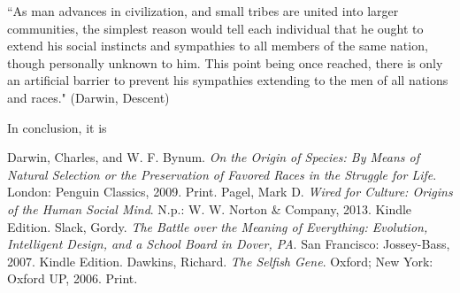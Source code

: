\documentclass[11pt, oneside]{article}
\begin{document}
``As man advances in civilization, and small tribes are united into larger communities, the simplest reason would tell each individual that he ought to extend his social instincts and sympathies to all members of the same nation, though personally unknown to him. This point being once reached, there is only an artificial barrier to prevent his sympathies extending to the men of all nations and races." (Darwin, Descent)

\par In conclusion, it is 

\begin{thebibliography}{9}
	Darwin, Charles, and W. F. Bynum.
	\emph{On the Origin of Species: By Means of Natural Selection or the Preservation of Favored Races in the Struggle for Life}.
	London: Penguin Classics, 2009.
	Print.
	Pagel, Mark D. 
	\emph{Wired for Culture: Origins of the Human Social Mind}. 
	N.p.: W. W. Norton \& Company, 2013. 
	Kindle Edition. 
	Slack, Gordy. 
	\emph{The Battle over the Meaning of Everything: Evolution, Intelligent Design, and a School Board in Dover, PA}.
	San Francisco: Jossey-Bass, 2007. 
	Kindle Edition.
	Dawkins, Richard. 
	\emph{The Selfish Gene}.
	Oxford; New York: Oxford UP, 2006. 
	Print.
\end{thebibliography}
\end{document}

